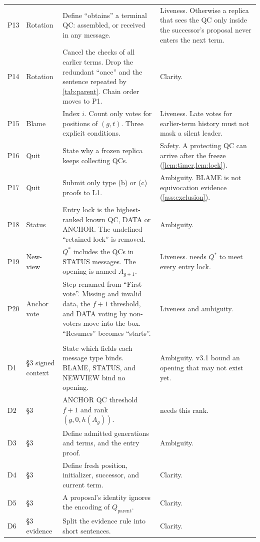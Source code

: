 \documentclass[11pt,a4paper]{article}
\begin{document}
{\begin{xltabular}{\linewidth}{@{}>{\raggedright\arraybackslash}p{.05\linewidth}
 >{\raggedright\arraybackslash}p{.15\linewidth} Y
 >{\raggedright\arraybackslash}p{.27\linewidth}@{}}
P13 & Rotation & Define ``obtains'' a terminal QC: assembled, or received
in any message. & Liveness. Otherwise a replica that sees the QC only
inside the successor's proposal never enters the next term.\\
P14 & Rotation & Cancel the checks of all earlier terms. Drop the
redundant ``once'' and the sentence repeated by \cref{tab:parent}. Chain
order moves to P1. & Clarity.\\
P15 & Blame & Index $i$. Count only votes for positions of $(g,t)$. Three
explicit conditions. & Liveness. Late votes for earlier-term history must
not mask a silent leader.\\
P16 & Quit & State why a frozen replica keeps collecting QCs. & Safety.
A protecting QC can arrive after the freeze
(\cref{lem:timer,lem:lock}).\\
P17 & Quit & Submit only type (b) or (c) proofs to L1. & Ambiguity.
BLAME is not equivocation evidence (\cref{ass:exclusion}).\\
P18 & Status & Entry lock is the highest-ranked known QC, DATA or ANCHOR.
The undefined ``retained lock'' is removed. & Ambiguity.\\
P19 & New-view & $Q^*$ includes the QCs in STATUS messages. The opening is
named $A_{g+1}$. & Liveness.  needs $Q^*$ to meet every
entry lock.\\
P20 & Anchor vote & Step renamed from ``First vote''. Missing and invalid
data, the $f+1$ threshold, and DATA voting by non-voters move into the
box. ``Resumes'' becomes ``starts''. & Liveness and ambiguity.\\
\\
D1 & \S3 signed context & State which fields each message type binds.
BLAME, STATUS, and NEWVIEW bind no opening. & Ambiguity. v3.1 bound an
opening that may not exist yet.\\
D2 & \S3 & ANCHOR QC threshold $f+1$ and rank $(g,0,h(A_g))$. &
 needs this rank.\\
D3 & \S3 & Define admitted generations and terms, and the entry proof. &
Ambiguity.\\
D4 & \S3 & Define fresh position, initializer, successor, and current
term. & Clarity.\\
D5 & \S3 & A proposal's identity ignores the encoding of
$Q_{\mathrm{parent}}$. & Clarity.\\
D6 & \S3 evidence & Split the evidence rule into short sentences. &
Clarity.\\

\end{xltabular}}
\end{document}
